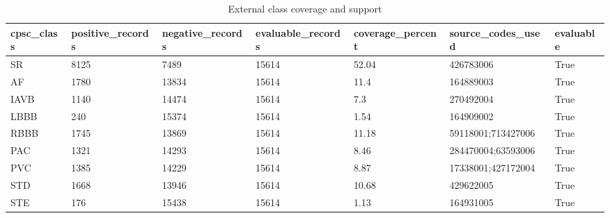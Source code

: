 \begin{table}[htbp]\centering\small
\caption{External class coverage and support}\label{tab:extcoverage}
\begin{tabular}{lllllll}
\hline
cpsc_class & positive_records & negative_records & evaluable_records & coverage_percent & source_codes_used & evaluable \\
\hline
SR & 8125 & 7489 & 15614 & 52.04 & 426783006 & True \\
AF & 1780 & 13834 & 15614 & 11.4 & 164889003 & True \\
IAVB & 1140 & 14474 & 15614 & 7.3 & 270492004 & True \\
LBBB & 240 & 15374 & 15614 & 1.54 & 164909002 & True \\
RBBB & 1745 & 13869 & 15614 & 11.18 & 59118001;713427006 & True \\
PAC & 1321 & 14293 & 15614 & 8.46 & 284470004;63593006 & True \\
PVC & 1385 & 14229 & 15614 & 8.87 & 17338001;427172004 & True \\
STD & 1668 & 13946 & 15614 & 10.68 & 429622005 & True \\
STE & 176 & 15438 & 15614 & 1.13 & 164931005 & True \\
\hline
\end{tabular}
\end{table}
